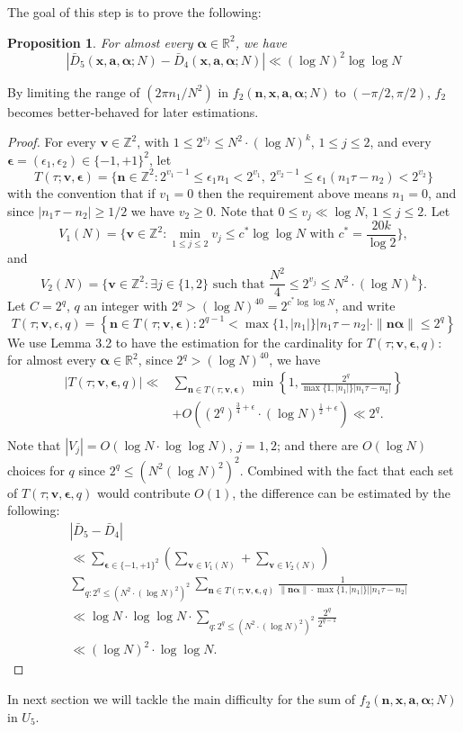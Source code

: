 \documentclass[11pt]{article}
\newtheorem{Prop}{Proposition}[section]
\newcommand{\fc}{\frac}
\renewcommand{\l}{\left}
\renewcommand{\r}{\right}
\newcommand{\Z}{\mathbb{Z}}
\newcommand{\R}{\mathbb{R}}
\renewcommand{\a}{\alpha}
\newcommand{\e}{\epsilon}
\renewcommand{\(}{\left(}
\renewcommand{\)}{\right)}
\renewcommand{\bf}{\mathbf}
\newcommand{\bal}{\begin{aligned}}
\newcommand{\eal}{\end{aligned}}
\newcommand{\n}{\bf{n}}
\newcommand{\bma}{\bm{\alpha}}
\newcommand{\ftwo}{f_2(\bf{n},\bf{x},\bm{a},\bm{\a};N)}
\renewcommand{\v}{\bf{v}}
\newcommand{\<}{\langle}
\renewcommand{\>}{\rangle}
\begin{document}
The goal of this step is to prove the following:
\begin{Prop}\label{sum7}
For almost every $\bma\in \R^2$, we have 
$$\l|\bar{D}_5(\bf{x},\bm{a},\bm{\a};N)-\bar{D}_4(\bf{x},\bm{a},\bm{\a};N)\r|\ll(\log N)^2 \log \log N
$$
\end{Prop}
By limiting the range of $(2\pi n_1/N^2)$ in $\ftwo$ to $(-\pi/2, \pi/2)$, $f_2$ becomes better-behaved for later estimations.
\begin{proof}
For every $\bf{v}\in\Z^2$, with $1\le 2^{v_j}\le N^2\cdot (\log N)^k$, $1\le j\le 2$, and every $\bf{\e}=(\e_1,\e_2)\in\{-1,+1\}^2$, let 
$$
T(\tau; \v,\bf{\e})=\{\n\in \Z^2: 2^{v_1-1}\le \e_1 n_1 <2^{v_1}, \ 2^{v_2-1}\le \e_1 (n_1\tau-n_2) <2^{v_2}\}
$$
with the convention that if $v_1=0$ then the requirement above means $n_1=0$, and since $|n_1\tau-n_2|\ge 1/2$ we have $v_2\ge 0$. Note that $0\le v_j\ll \log N$, $1\le j\le 2$. 
Let 
$$
V_1(N)=\{\v\in \Z^2: \min_{1\le j\le 2} v_j \le c^*\log \log N \text{ with } c^* = \fc{20k}{\log 2}\},
$$
and 
$$
V_2(N)=\{\v\in \Z^2 :  \exists j\in \{1,2\} \text{ such that } \fc{N^2}{4} \le 2^{v_j}\le N^2\cdot (\log N)^k\}.
$$
Let $C=2^q$, $q$ an integer with $2^q>(\log N)^{40}=2^{c^* \log \log N}$, and write
$$
T(\tau; \v,\e,q)=\l\{ \n\in T(\tau; \v,\bf{\e}): 2^{q-1}< \max\{1,|n_1|\}|n_1\tau-n_2|\cdot \|\n\bma\|\le 2^q\r\}
$$
We use Lemma 3.2 to have the estimation for the cardinality for $T(\tau; \v,\bf{\e},q)$: for almost every $\bma\in \R^2$, since $2^q>(\log N)^{40}$, we have 
$$
\bal
|T(\tau; \v,\bf{\e},q)|\ll &\sum_{\n\in T(\tau; \v,\bf{\e})} \min\l\{1,\fc{2^q}{\max\{1,|n_1|\} |n_1\tau-n_2|}\r\}\\
&+O((2^q)^{\fc{3}{4}+\e}\cdot (\log N)^{\fc{1}{2}+\e})\ll 2^q.\\
\eal
$$
Note that $|V_j|=O(\log N\cdot \log \log N)$, $j=1,2$; and there are $O(\log N)$ choices for $q$ since $2^q\le (N^2(\log N)^2)^2$. Combined with the fact that each set of $T(\tau; \v,\bf{\e},q)$ would contribute $O(1)$, the difference can be estimated by the following:
$$
\bal
&|\bar{D}_5-\bar{D}_4|\\
&\ll \sum_{\bf{\e}\in \{-1,+1\}^2}\l(\sum_{\v\in V_1(N)}+\sum_{\v\in V_2(N)} \r)\\
&\sum_{q: 2^q\le (N^2\cdot (\log N)^2)^2} \sum_{\n\in T(\tau; \v,\bf{\e},q)} \fc{1}{\|\n\bma\|\cdot \max\{1,|n_1|\}||n_1\tau-n_2|}\\
&\ll \log N \cdot \log \log N \cdot \sum_{q: 2^q\le (N^2\cdot (\log N)^2)^2} \fc{2^q}{2^{q-1}}\\
&\ll (\log N)^2\cdot \log \log N.
\eal
$$
\end{proof}
In next section we will tackle the main difficulty for the sum of $\ftwo$ in $U_5$.
\end{document}
